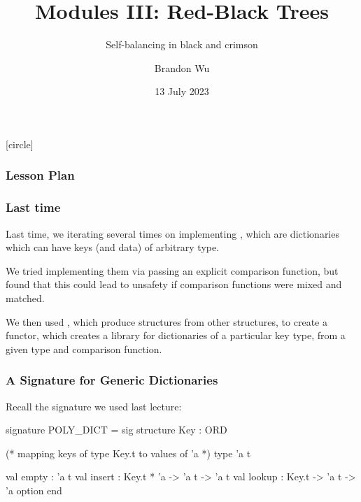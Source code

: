 \documentclass[aspectratio=169, handout]{beamer}
\title{Modules III: Red-Black Trees} %
\subtitle{Self-balancing in black and crimson} %
\date{13 July 2023} %
\author{Brandon Wu} %
\newif\ifcolorlambda
\begin{document}
\ifweb
    \renewcommand{\pause}{}
\fi

[circle]

{
\begin{frame}[plain]
    \colorlambdatrue
    \titlepage
\end{frame}
}


\begin{frame}[fragile]
  \frametitle{Lesson Plan}

  \tableofcontents
\end{frame}

\begin{frame}[fragile]
  \frametitle{Last time}

  Last time, we iterating several times on implementing ,
  which are dictionaries which can have keys (and data) of arbitrary type.

  \pause
  \vspace{\fill}

  We tried implementing them via passing an explicit comparison function, but found
  that this could lead to unsafety if comparison functions were mixed and matched.

  \pause
  \vspace{\fill}

  We then used , which produce structures from other structures, to
  create a  functor, which creates a library for dictionaries of a
  particular key type, from a given type and comparison function.
\end{frame}


\begin{frame}[fragile]
  \frametitle{A Signature for Generic Dictionaries}

  Recall the  signature we used last lecture:

  \begin{codeblock}
    signature POLY_DICT =
      sig
        structure Key : ORD

        (* mapping keys of type Key.t to values of 'a *)
        type 'a t

        val empty : 'a t
        val insert : Key.t * 'a -> 'a t -> 'a t
        val lookup : Key.t -> 'a t -> 'a option
      end
  \end{codeblock}
\end{frame}
\end{document}
